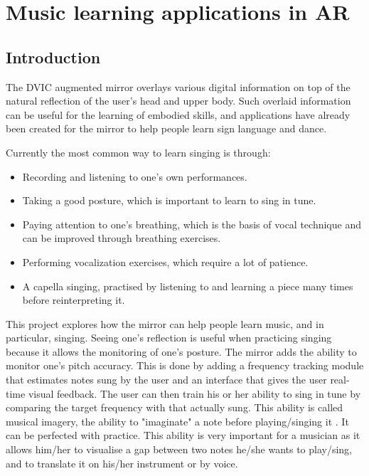 \chapter{Music learning applications in AR}

\section{Introduction}

The DVIC augmented mirror overlays various digital information on top of the natural reflection of the user's head and upper body. Such overlaid information can be useful for the learning of embodied skills, and applications have already been created for the mirror to help people learn sign language and dance.

Currently the most common way to learn singing is through: 
\begin{itemize}
    \item Recording and listening to one’s own performances. 
    \item Taking a good posture, which is important to learn to sing in tune.
    \item Paying attention to one’s breathing, which is the basis of vocal technique and can be improved through breathing exercises.
    \item Performing vocalization exercises, which require a lot of patience.
    \item A capella singing, practised by listening to and learning a piece many times before reinterpreting it. 
\end{itemize}
   

This project explores how the mirror can help people learn music, and in particular, singing. Seeing one's reflection is useful when practicing singing because it allows the monitoring of one's posture. The mirror adds the ability to monitor one's pitch accuracy. This is done by adding a frequency tracking module that estimates notes sung by the user and an interface that gives the user real-time visual feedback.
The user can then train his or her ability to sing in tune by comparing the target frequency with that actually sung. This ability is called musical imagery, the ability to "imaginate" a note before playing/singing it \cite{godoy2012musical}. It can be perfected with practice. This ability is very important for a musician as it allows him/her to visualise a gap between two notes he/she wants to play/sing, and to translate it on his/her instrument or by voice.

